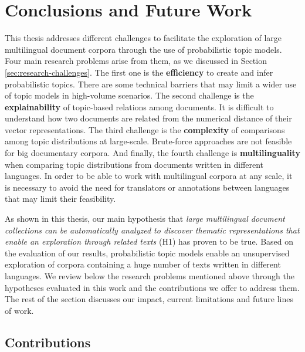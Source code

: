 

\chapter{Conclusions and Future Work}\label{ch:conclusion}

\graphicspath{{conclusions/figures/}}

This thesis addresses different challenges to facilitate the exploration of large multilingual document corpora through the use of probabilistic topic models. Four main research problems arise from them, as we discussed in Section \ref{sec:research-challenges}. The first one is the \textbf{efficiency} to create and infer probabilistic topics. There are some technical barriers that may limit a wider use of topic models in high-volume scenarios. The second challenge is the \textbf{explainability} of topic-based relations among documents. It is difficult to understand how two documents are related from the numerical distance of their vector representations. The third challenge is the \textbf{complexity} of comparisons among topic distributions at large-scale. Brute-force approaches are not feasible for big documentary corpora. And finally, the fourth challenge is \textbf{multilinguality} when comparing topic distributions from documents written in different languages. In order to be able to work with multilingual corpora at any scale, it is necessary to avoid the need for translators or annotations between languages that may limit their feasibility.

As shown in this thesis, our main hypothesis that \textit{large multilingual document collections can be automatically analyzed to discover thematic representations that enable an exploration through related texts} (H1) has proven to be true. Based on the evaluation of our results, probabilistic topic models enable an unsupervised exploration of corpora containing a huge number of texts written in different languages. We review below the research problems mentioned above through the hypotheses evaluated in this work and the contributions we offer to address them. The rest of the section discusses our impact, current limitations and future lines of work. 


\section{Contributions}



